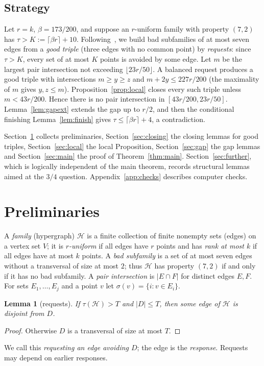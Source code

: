 \documentclass[11pt]{amsart}
\newtheorem{lemma}[theorem]{Lemma}
\theoremstyle{definition}
\theoremstyle{remark}
\newcommand{\cH}{\mathcal H}
\newcommand{\ceil}[1]{\lceil #1\rceil}
\newcommand{\floor}[1]{\lfloor #1\rfloor}
\begin{document}
\subsection*{Strategy}
Let $r=k$, $\beta=173/200$, and suppose an $r$-uniform family with property $(7,2)$ has $\tau>K:=\ceil{\beta r}+10$. Following~\cite{FKW}, we build bad subfamilies of at most seven edges from a \emph{good triple} (three edges with no common point) by \emph{requests}: since $\tau>K$, every set of at most $K$ points is avoided by some edge. Let $m$ be the largest pair intersection not exceeding $\floor{23r/50}$. A balanced request produces a good triple with intersections $m\ge y\ge z$ and $m+2y\le227r/200$ (the maximality of $m$ gives $y,z\le m$). Proposition~\ref{prop:local} closes every such triple unless $m<43r/200$. Hence there is no pair intersection in $[43r/200,23r/50]$. Lemma~\ref{lem:gapext} extends the gap up to $r/2$, and then the conditional finishing Lemma~\ref{lem:finish} gives $\tau\le\ceil{\beta r}+4$, a contradiction.

Section~\ref{sec:prelim} collects preliminaries, Section~\ref{sec:closing} the closing lemmas for good triples, Section~\ref{sec:local} the local Proposition, Section~\ref{sec:gap} the gap lemmas and Section~\ref{sec:main} the proof of Theorem~\ref{thm:main}. Section~\ref{sec:further}, which is logically independent of the main theorem, records structural lemmas aimed at the $3/4$ question. Appendix~\ref{app:checks} describes computer checks.

\section{Preliminaries}\label{sec:prelim}

A \emph{family} (hypergraph) $\cH$ is a finite collection of finite nonempty sets (edges) on a vertex set $V$; it is \emph{$r$-uniform} if all edges have $r$ points and has \emph{rank at most $k$} if all edges have at most $k$ points. A \emph{bad subfamily} is a set of at most seven edges without a transversal of size at most $2$; thus $\cH$ has property $(7,2)$ if and only if it has no bad subfamily. A \emph{pair intersection} is $|E\cap F|$ for distinct edges $E,F$. For sets $E_1,\dots,E_j$ and a point $v$ let $\sigma(v)=\{i:v\in E_i\}$.

\begin{lemma}[requests]\label{lem:request}
If $\tau(\cH)>T$ and $|D|\le T$, then some edge of $\cH$ is disjoint from $D$.
\end{lemma}
\begin{proof}
Otherwise $D$ is a transversal of size at most $T$.
\end{proof}
We call this \emph{requesting an edge avoiding $D$}; the edge is the \emph{response}. Requests may depend on earlier responses.
\end{document}
